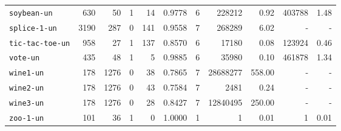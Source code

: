 \begin{tabular}{lccrrrrrrrr}
\texttt{soybean-un} & \multicolumn{1}{r}{630} & \multicolumn{1}{r}{50}  & 1 & 14 & 0.9778 & 6 & 228212 & 0.92 & 403788 & 1.48\\
\texttt{splice-1-un} & \multicolumn{1}{r}{3190} & \multicolumn{1}{r}{287}  & 0 & 141 & 0.9558 & 7 & 268289 & 6.02 & - & -\\
\texttt{tic-tac-toe-un} & \multicolumn{1}{r}{958} & \multicolumn{1}{r}{27}  & 1 & 137 & 0.8570 & 6 & 17180 & 0.08 & 123924 & 0.46\\
\texttt{vote-un} & \multicolumn{1}{r}{435} & \multicolumn{1}{r}{48}  & 1 & 5 & 0.9885 & 6 & 35980 & 0.10 & 461878 & 1.34\\
\texttt{wine1-un} & \multicolumn{1}{r}{178} & \multicolumn{1}{r}{1276}  & 0 & 38 & 0.7865 & 7 & 28688277 & 558.00 & - & -\\
\texttt{wine2-un} & \multicolumn{1}{r}{178} & \multicolumn{1}{r}{1276}  & 0 & 43 & 0.7584 & 7 & 2481 & 0.24 & - & -\\
\texttt{wine3-un} & \multicolumn{1}{r}{178} & \multicolumn{1}{r}{1276}  & 0 & 28 & 0.8427 & 7 & 12840495 & 250.00 & - & -\\
\texttt{zoo-1-un} & \multicolumn{1}{r}{101} & \multicolumn{1}{r}{36}  & 1 & 0 & 1.0000 & 1 & 1 & 0.01 & 1 & 0.01\\
\bottomrule
\end{tabular}
